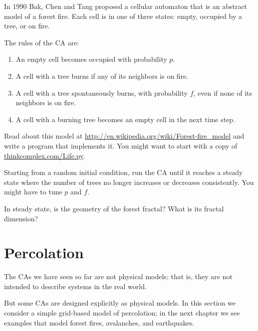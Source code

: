 \documentclass[10pt]{book}
\begin{document}
\begin{ex}

In 1990 Bak, Chen and Tang proposed a cellular automaton that is
an abstract model of a forest fire.  Each cell is in one of three
states: empty, occupied by a tree, or on fire.

The rules of the CA are:

\begin{enumerate}

\item An empty cell becomes occupied with probability $p$.

\item A cell with a tree burns if any of its neighbors
  is on fire.

\item A cell with a tree spontaneously burns, with
  probability $f$, even if none of its neighbors is on fire.

\item A cell with a burning tree becomes an empty cell in the next
  time step.

\end{enumerate}

Read about this model at
\url{http://en.wikipedia.org/wiki/Forest-fire_model} and write a
program that implements it.  You might want to start with a copy of
\url{thinkcomplex.com/Life.py}.

Starting from a random initial condition, run the CA until it reaches
a steady state where the number of trees no longer increases or
decreases consistently.  You might have to tune $p$ and $f$.

In steady state, is the geometry of the forest fractal?
What is its fractal dimension?

\end{ex}


\section{Percolation}

The CAs we have seen so far are not physical models; that is, they are
not intended to describe systems in the real world.

But some CAs are designed explicitly as physical models.  In this
section we consider a simple grid-based model of percolation;
in the next chapter we see examples that model forest fires,
avalanches, and earthquakes.
\end{document}
